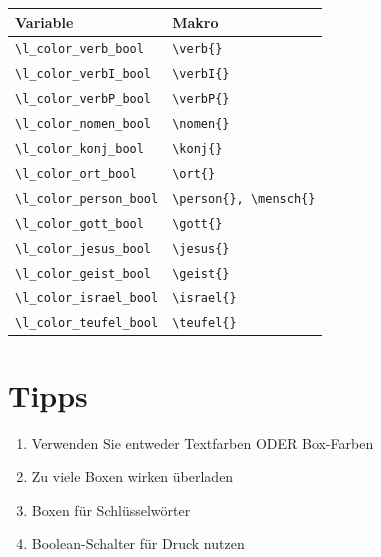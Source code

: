 \documentclass[12pt,a4paper]{scrartcl}
\begin{document}
\begin{tabular}{ll}
\toprule
\textbf{Variable} & \textbf{Makro} \\
\midrule
\lstinline|\l_color_verb_bool| & \lstinline|\verb{}| \\
\lstinline|\l_color_verbI_bool| & \lstinline|\verbI{}| \\
\lstinline|\l_color_verbP_bool| & \lstinline|\verbP{}| \\
\lstinline|\l_color_nomen_bool| & \lstinline|\nomen{}| \\
\lstinline|\l_color_konj_bool| & \lstinline|\konj{}| \\
\lstinline|\l_color_ort_bool| & \lstinline|\ort{}| \\
\lstinline|\l_color_person_bool| & \lstinline|\person{}, \mensch{}| \\
\lstinline|\l_color_gott_bool| & \lstinline|\gott{}| \\
\lstinline|\l_color_jesus_bool| & \lstinline|\jesus{}| \\
\lstinline|\l_color_geist_bool| & \lstinline|\geist{}| \\
\lstinline|\l_color_israel_bool| & \lstinline|\israel{}| \\
\lstinline|\l_color_teufel_bool| & \lstinline|\teufel{}| \\
\bottomrule
\end{tabular}

\section{Tipps}

\begin{enumerate}
  \item Verwenden Sie entweder Textfarben ODER Box-Farben
  \item Zu viele Boxen wirken {\"u}berladen
  \item Boxen f{\"u}r Schl{\"u}sselw{\"o}rter
  \item Boolean-Schalter f{\"u}r Druck nutzen
\end{enumerate}
\end{document}
